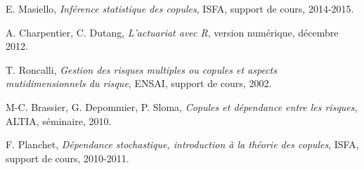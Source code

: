\begin{thebibliography}{ABC}	


\label{ref1} E. Masiello, \emph{Inférence statistique des copules}, ISFA, support de cours, 2014-2015.

\label{ref2} A. Charpentier, C. Dutang, \emph{L'actuariat avec R}, version numérique, décembre 2012.

\label{ref3} T. Roncalli, \emph{Gestion des risques multiples ou copules et aspects mutidimensionnels du risque}, ENSAI, support de cours, 2002.

\label{ref4} M-C. Brassier, G. Depommier, P. Sloma, \emph{Copules et dépendance entre les risques}, ALTIA, séminaire, 2010.

\label{ref1} F. Planchet, \emph{Dépendance stochastique, introduction à la théorie des copules}, ISFA, support de cours, 2010-2011.

\end{thebibliography}


